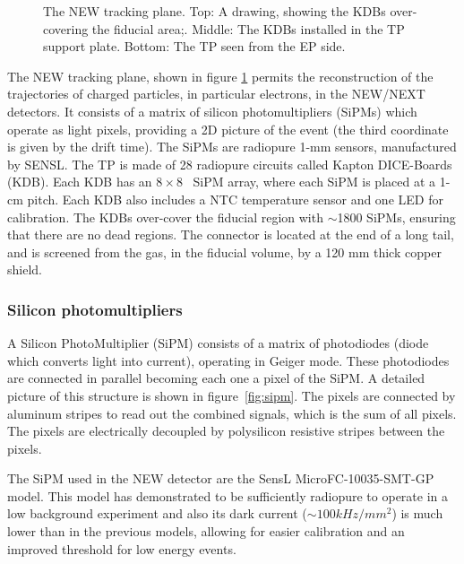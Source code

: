 \begin{figure}[hpt!]
\caption{The NEW tracking plane. Top: A drawing, showing the KDBs over-covering the fiducial area;.
Middle: The KDBs installed in the TP support plate. Bottom: The TP seen from the EP side.} \label{fig:NTP}
\end{figure}

The NEW tracking plane, shown in figure \ref{fig:NTP} permits the reconstruction of the trajectories of charged particles, in particular electrons, in the NEW/NEXT detectors. It consists of a matrix of silicon photomultipliers (SiPMs) which operate as light pixels, providing a 2D picture of the event (the third coordinate is given by the drift time). The SiPMs are radiopure 1-mm sensors, manufactured by SENSL. The TP is made of 28 radiopure circuits called Kapton DICE-Boards (KDB). Each KDB has an $8\times8$~ SiPM array, where each SiPM is placed at a 1-cm pitch. Each KDB also includes a NTC temperature sensor and one LED for calibration. The KDBs over-cover the fiducial region with $\sim$1800 SiPMs, ensuring that there are no dead regions. The connector is located at the end of a long tail, and is screened from the gas, in the fiducial volume, by a 120 mm thick copper shield.

\subsubsection*{Silicon photomultipliers}\label{sec:sipms}
A Silicon PhotoMultiplier (SiPM) consists of a matrix of photodiodes (diode which converts light into current), operating in Geiger mode. These photodiodes are connected in parallel becoming each one a pixel of the SiPM. A detailed picture of this structure is shown in figure~\ref{fig:sipm}. The pixels are connected by aluminum stripes to read out the combined signals, which is the sum of all pixels. The pixels are electrically decoupled by polysilicon resistive stripes between the pixels. 

The SiPM used in the NEW detector are the SensL MicroFC-10035-SMT-GP model. This model has demonstrated to be sufficiently radiopure to operate in a low background experiment and also its dark current ($\sim100kHz/mm^2$) is much lower than in the previous models, allowing for easier calibration and an improved threshold for low energy events.


